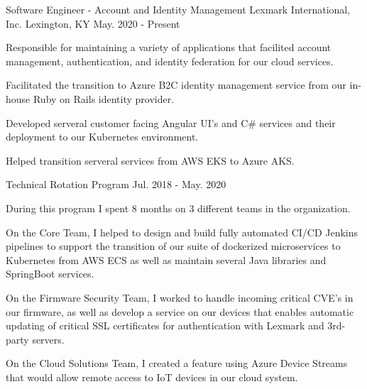 

\begin{cventries}

  \cventry
    {Software Engineer - Account and Identity Management} %
    {Lexmark International, Inc.} %
    {Lexington, KY} %
    {May. 2020 - Present} %
    {
      \begin{cvitems} %
        \item {Responsible for maintaining a variety of applications that facilited account management, authentication, and identity federation for our cloud services.}
        \item {Facilitated the transition to Azure B2C identity management service from our in-house Ruby on Rails identity provider.}
        \item {Developed serveral customer facing Angular UI's and C\# services and their deployment to our Kubernetes environment.}
        \item {Helped transition serveral services from AWS EKS to Azure AKS.}
      \end{cvitems}
    }

  \cventry
    {Technical Rotation Program} %
    { } %
    { } %
    {Jul. 2018 - May. 2020} %
    {
      \begin{cvitems} %
        \item {During this program I spent 8 months on 3 different teams in the organization.}
        \item {On the Core Team, I helped to design and build fully automated CI/CD Jenkins pipelines to support the transition of our suite of dockerized microservices to Kubernetes from AWS ECS as well as maintain several Java libraries and SpringBoot services.}
        \item {On the Firmware Security Team, I worked to handle incoming critical CVE's in our firmware, as well as develop a service on our devices that enables automatic updating of critical SSL certificates for authentication with Lexmark and 3rd-party servers.}
        \item {On the Cloud Solutions Team, I created a feature using Azure Device Streams that would allow remote access to IoT devices in our cloud system.}
      \end{cvitems}
    }


\end{cventries}
